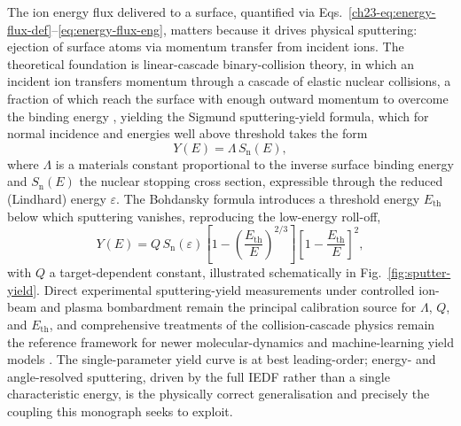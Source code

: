 The ion energy flux delivered to a surface, quantified via Eqs.~\eqref{ch23-eq:energy-flux-def}--\eqref{eq:energy-flux-eng}, matters because it drives physical sputtering: ejection of surface atoms via momentum transfer from incident ions. The theoretical foundation is linear-cascade binary-collision theory, in which an incident ion transfers momentum through a cascade of elastic nuclear collisions, a fraction of which reach the surface with enough outward momentum to overcome the binding energy \cite{ref0143}, yielding the Sigmund sputtering-yield formula, which for normal incidence and energies well above threshold takes the form
\begin{equation}
Y(E) = \Lambda\, S_{\mathrm{n}}(E),
\end{equation}
where $\Lambda$ is a materials constant proportional to the inverse surface binding energy and $S_{\mathrm{n}}(E)$ the nuclear stopping cross section, expressible through the reduced (Lindhard) energy $\varepsilon$. The Bohdansky formula introduces a threshold energy $E_{\mathrm{th}}$ below which sputtering vanishes, reproducing the low-energy roll-off,
\begin{equation}
Y(E) = Q\, S_{\mathrm{n}}(\varepsilon) \left[1 - \left(\frac{E_{\mathrm{th}}}{E}\right)^{2/3}\right]\left[1 - \frac{E_{\mathrm{th}}}{E}\right]^{2},
\label{ch23-eq:bohdansky}
\end{equation}
with $Q$ a target-dependent constant, illustrated schematically in Fig.~\ref{fig:sputter-yield}. Direct experimental sputtering-yield measurements under controlled ion-beam and plasma bombardment \cite{ref0152} remain the principal calibration source for $\Lambda$, $Q$, and $E_{\mathrm{th}}$, and comprehensive treatments of the collision-cascade physics remain the reference framework for newer molecular-dynamics and machine-learning yield models \cite{ref0144}. The single-parameter yield curve is at best leading-order; energy- and angle-resolved sputtering, driven by the full IEDF rather than a single characteristic energy, is the physically correct generalisation and precisely the coupling this monograph seeks to exploit.

